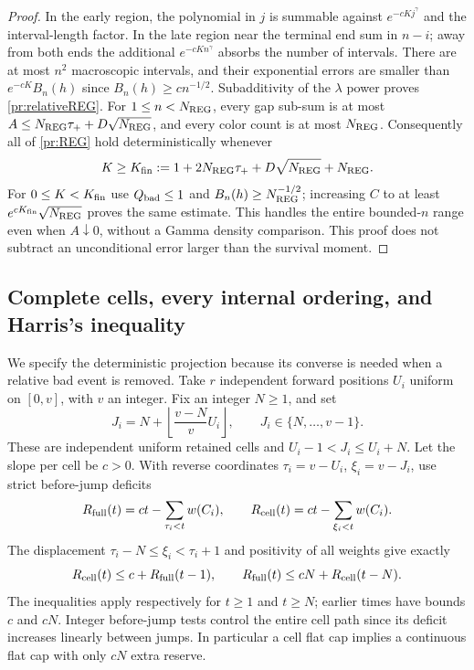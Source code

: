 \begin{proof}
In the early region, the polynomial in $j$ is summable against
$e^{-cKj^\gamma}$ and the interval-length factor. In the late region
near the terminal end sum in $n-i$; away from both ends the additional
$e^{-cKn^\gamma}$ absorbs the number of intervals. There are at most
$n^2$ macroscopic intervals, and their exponential errors are smaller
than $e^{-cK}B_n(h)$ since $B_n(h)\ge c n^{-1/2}$.
Subadditivity of the $\lambda$ power proves \eqref{pr:relativeREG}.
For $1\le n<N_{\rm REG}$, every gap sub-sum is at most
$A\le N_{\rm REG}\tau_++D\sqrt{N_{\rm REG}}$, and every color count
is at most $N_{\rm REG}$. Consequently all of \eqref{pr:REG} hold
deterministically whenever
\[
 K\ge K_{\rm fin}:=1+2N_{\rm REG}\tau_+
                       +D\sqrt{N_{\rm REG}}+N_{\rm REG}.
\]
For $0\le K<K_{\rm fin}$ use $Q_{\rm bad}\le1$ and
$B_n(h)\ge N_{\rm REG}^{-1/2}$; increasing $C$ to at least
$e^{cK_{\rm fin}}\sqrt{N_{\rm REG}}$ proves the same estimate.
This handles the entire bounded-$n$ range even when $A\downarrow0$,
without a Gamma density comparison.
This proof does not subtract an unconditional error larger than the
survival moment.
\end{proof}

\subsection{Complete cells, every internal ordering, and Harris's inequality}

We specify the deterministic projection because its converse is needed
when a relative bad event is removed. Take $r$ independent forward
positions $U_i$ uniform on $[0,v]$, with $v$ an integer. Fix an integer
$N\ge1$, and set
\begin{equation}
 J_i=N+\left\lfloor\frac{v-N}{v}U_i\right\rfloor,
 \qquad J_i\in\{N,\ldots,v-1\}.                            \label{pr:cellmap}
\end{equation}
These are independent uniform retained cells and
$U_i-1<J_i\le U_i+N$. Let the slope per cell be $c>0$. With reverse
coordinates $\tau_i=v-U_i$, $\xi_i=v-J_i$, use strict before-jump deficits
\[
 R_{\rm full}(t)=ct-\sum_{\tau_i<t}w(C_i),\qquad
 R_{\rm cell}(t)=ct-\sum_{\xi_i<t}w(C_i).
\]
The displacement $\tau_i-N\le\xi_i<\tau_i+1$ and positivity of all
weights give exactly
\begin{equation}
 R_{\rm cell}(t)\le c+R_{\rm full}(t-1),\qquad
 R_{\rm full}(t)\le cN+R_{\rm cell}(t-N).                   \label{pr:twocell}
\end{equation}
The inequalities apply respectively for $t\ge1$ and $t\ge N$; earlier
times have bounds $c$ and $cN$. Integer before-jump tests control the
entire cell path since its deficit increases linearly between jumps.
In particular a cell flat cap implies a continuous flat cap with only
$cN$ extra reserve.


